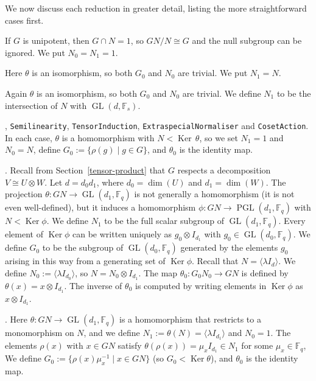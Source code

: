 \documentclass[12pt,twoside,reqno,psamsfonts]{amsproc}
\newcommand{\nullsubgp}{{null subgroup}\xspace}
\numberwithin{equation}{section}
\numberwithin{figure}{section}
\theoremstyle{plain}
\theoremstyle{definition}
\theoremstyle{remark}
\newcommand{\field}[1]{\mathbb{#1}}
\newcommand{\F}{\field{F}}
\DeclareMathOperator{\GL}{GL}
\DeclareMathOperator{\PGL}{PGL}
\DeclareMathOperator{\Ker}{Ker}
\begin{document}
We now discuss each reduction in greater detail,
listing the more straightforward cases first.

If $G$ is unipotent, then $G \cap N=1$, 
so $GN/N \cong G$ and the \nullsubgp can
be ignored.  We put $N_0=N_1=1$.

\vspace*{0.1cm} 
Here $\theta$ is an isomorphism, so both $G_0$ and $N_0$ are trivial. 
We put $N_1=N$.

\vspace*{0.1cm} 
Again $\theta$ is an isomorphism, so both  $G_0$ and $N_0$ are trivial.
We define $N_1$ to be the intersection of $N$ with $\GL(d,\F_s)$.

\vspace{0.1cm} , {\tt Semilinearity}, 
{\tt TensorInduction}, {\tt ExtraspecialNormaliser} and {\tt CosetAction}.
In each case, $\theta$ is a homomorphism with $N < \Ker\, \theta$,
so we set $N_1=1$ and $N_0=N$, 
define $G_0 := \{ \rho(g) \mid g \in G \}$,
 and $\theta_0$ is  the identity map.

\vspace*{0.1cm} .
Recall from Section~\ref{tensor-product} that
$G$ respects a decomposition $V \cong U \otimes W$.
Let $d=d_0d_1$, where $d_0 = \dim(U)$ and $d_1 = \dim(W)$.
The projection $\theta:GN \to \GL(d_1,\F_q)$
is not generally a homomorphism (it is not even well-defined),
but it induces a homomorphism
$\phi:GN \to \PGL(d_1,\F_q)$ with $N < \Ker \phi$. We define $N_1$ to 
be the full scalar subgroup of $\GL(d_1,\F_q)$.
Every element of  $\Ker \phi$ can be written uniquely as $g_0 \otimes I_{d_1}$
with $g_0 \in \GL(d_0,\F_q)$.
We define $G_0$ to be the subgroup of $\GL(d_0,\F_q)$ generated by the elements
$g_0$ arising in this way from a generating set of $\Ker \phi$.
Recall that $N = \langle \lambda I_d \rangle$. 
We define $N_0 := \langle \lambda I_{d_0} \rangle$,
so $N = N_0 \otimes I_{d_1}$.
The map $\theta_0:G_0N_0 \to GN$ is defined by $\theta(x) = x \otimes I_{d_1}$.
The inverse of $\theta_0$ is computed by writing elements in
$\Ker \phi$ as $x \otimes I_{d_1}$.

\vspace*{0.1cm} .
Here $\theta: GN \to \GL(d_1,\F_q)$ is a homomorphism that restricts to
a monomorphism on $N$, and we define $N_1 := \theta(N) =  \langle 
\lambda I_{d_1} \rangle$
and $N_0=1$. The elements $\rho(x)$ with $x \in GN$ satisfy
$\theta(\rho(x)) = \mu_x  I_{d_1} \in N_1$ for some $\mu_x \in \F_q$,
We define $G_0 := \{ \rho(x) \mu_x^{-1} \mid x \in GN \}$
(so $G_0 < \Ker \theta $), and $\theta_0$ is the identity map.
\end{document}
